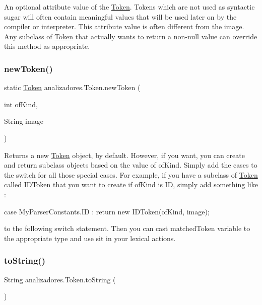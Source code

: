 An optional attribute value of the \mbox{\hyperlink{classanalizadores_1_1_token}{Token}}. Tokens which are not used as syntactic sugar will often contain meaningful values that will be used later on by the compiler or interpreter. This attribute value is often different from the image. Any subclass of \mbox{\hyperlink{classanalizadores_1_1_token}{Token}} that actually wants to return a non-\/null value can override this method as appropriate. \mbox{\label{classanalizadores_1_1_token_aca2ccbc7bd267f4098be9f4a0b07fc47}} 
\subsubsection{\texorpdfstring{new\+Token()}{newToken()}}
{\footnotesize\ttfamily static \mbox{\hyperlink{classanalizadores_1_1_token}{Token}} analizadores.\+Token.\+new\+Token (\begin{DoxyParamCaption}\item[{int}]{of\+Kind,  }\item[{String}]{image }\end{DoxyParamCaption})\hspace{0.3cm}{\ttfamily [static]}}

Returns a new \mbox{\hyperlink{classanalizadores_1_1_token}{Token}} object, by default. However, if you want, you can create and return subclass objects based on the value of of\+Kind. Simply add the cases to the switch for all those special cases. For example, if you have a subclass of \mbox{\hyperlink{classanalizadores_1_1_token}{Token}} called I\+D\+Token that you want to create if of\+Kind is ID, simply add something like \+:

case My\+Parser\+Constants.\+ID \+: return new I\+D\+Token(of\+Kind, image);

to the following switch statement. Then you can cast matched\+Token variable to the appropriate type and use sit in your lexical actions. \mbox{\label{classanalizadores_1_1_token_a6b1216eeaff66da8354424d684fe0eb2}} 
\subsubsection{\texorpdfstring{to\+String()}{toString()}}
{\footnotesize\ttfamily String analizadores.\+Token.\+to\+String (\begin{DoxyParamCaption}{ }\end{DoxyParamCaption})}

